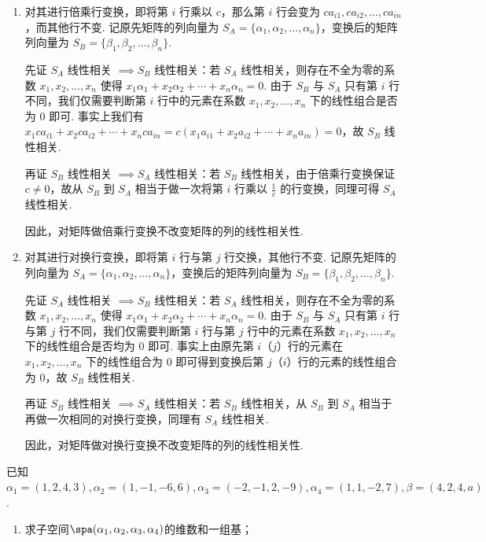 \begin{exercise}
\begin{exgroup}
\begin{answer}
            \begin{enumerate}
                \item 对其进行倍乘行变换，即将第 $i$ 行乘以 $c$，那么第 $i$ 行会变为 $c a_{i1}, c a_{i2}, \ldots, c a_{in}$，而其他行不变. 记原先矩阵的列向量为 $S_A = \{\alpha_1,\alpha_2,\ldots,\alpha_n\}$，变换后的矩阵列向量为 $S_B = \{\beta_1,\beta_2,\ldots,\beta_n\}$.

                    先证 $S_A$ 线性相关 $\implies S_B$ 线性相关：若 $S_A$ 线性相关，则存在不全为零的系数 $x_1, x_2, \ldots, x_n$ 使得 $x_1 \alpha_1 + x_2 \alpha_2 + \cdots + x_n \alpha_n = 0$. 由于 $S_B$ 与 $S_A$ 只有第 $i$ 行不同，我们仅需要判断第 $i$ 行中的元素在系数 $x_1, x_2, \ldots, x_n$ 下的线性组合是否为 $0$ 即可. 事实上我们有 $x_1 c a_{i1} + x_2 c a_{i2} + \cdots + x_n c a_{in} = c(x_1 a_{i1} + x_2 a_{i2} + \cdots + x_n a_{in}) = 0$，故 $S_B$ 线性相关.

                    再证 $S_B$ 线性相关 $\implies S_A$ 线性相关：若 $S_B$ 线性相关，由于倍乘行变换保证 $c \neq 0$，故从 $S_B$ 到 $S_A$ 相当于做一次将第 $i$ 行乘以 $\frac{1}{c}$ 的行变换，同理可得 $S_A$ 线性相关.

                    因此，对矩阵做倍乘行变换不改变矩阵的列的线性相关性.

                \item 对其进行对换行变换，即将第 $i$ 行与第 $j$ 行交换，其他行不变. 记原先矩阵的列向量为 $S_A = \{\alpha_1,\alpha_2,\ldots,\alpha_n\}$，变换后的矩阵列向量为 $S_B = \{\beta_1,\beta_2,\ldots,\beta_n\}$.

                    先证 $S_A$ 线性相关 $\implies S_B$ 线性相关：若 $S_A$ 线性相关，则存在不全为零的系数 $x_1, x_2, \ldots, x_n$ 使得 $x_1 \alpha_1 + x_2 \alpha_2 + \cdots + x_n \alpha_n = 0$. 由于 $S_B$ 与 $S_A$ 只有第 $i$ 行与第 $j$ 行不同，我们仅需要判断第 $i$ 行与第 $j$ 行中的元素在系数 $x_1, x_2, \ldots, x_n$ 下的线性组合是否均为 $0$ 即可. 事实上由原先第 $i$（$j$）行的元素在 $x_1, x_2, \ldots, x_n$ 下的线性组合为 $0$ 即可得到变换后第 $j$（$i$）行的元素的线性组合为 $0$，故 $S_B$ 线性相关.

                    再证 $S_B$ 线性相关 $\implies S_A$ 线性相关：若 $S_B$ 线性相关，从 $S_B$ 到 $S_A$ 相当于再做一次相同的对换行变换，同理有 $S_A$ 线性相关.

                    因此，对矩阵做对换行变换不改变矩阵的列的线性相关性.
            \end{enumerate}
        \end{answer}

        \item 已知$\alpha_1=(1,2,4,3),\alpha_2=(1,-1,-6,6),\alpha_3=(-2,-1,2,-9),\alpha_4=(1,1,-2,7),\beta=(4,2,4,a)$.
        \begin{enumerate}
            \item 求子空间$\spa(\alpha_1,\alpha_2,\alpha_3,\alpha_4)$的维数和一组基；


\end{enumerate}
\end{exgroup}
\end{exercise}
